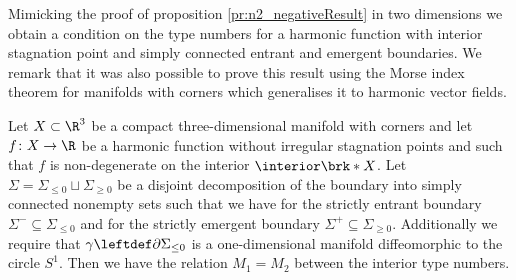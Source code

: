 Mimicking the proof of proposition \ref{pr:n2_negativeResult} in two dimensions we obtain a condition on the type numbers for a harmonic function with interior
stagnation point and simply connected entrant and emergent boundaries.
We remark that it was also possible to prove this result using the Morse index theorem for manifolds with corners which generalises it to harmonic vector fields.
\begin{proposition}\label{pr:n3_inflowOutflowRels}
  Let $X\subset\R^3$ be a compact three-dimensional manifold with corners and
  let $f\colon X\to\R$ be a harmonic function without irregular stagnation points and such that $f$ is non-degenerate on the interior $\interior\brk*{X}$.
  Let $\Sigma=\Sigma_{\leq0}\sqcup\Sigma_{\geq0}$ be a disjoint decomposition of the boundary into simply connected nonempty sets such that
  we have for the strictly entrant boundary $\Sigma^-\subseteq\Sigma_{\leq0}$ and for the strictly emergent boundary
  $\Sigma^+\subseteq\Sigma_{\geq0}$. Additionally we require that $\gamma\leftdef\partial\Sigma_{\leq0}$ is a one-dimensional manifold diffeomorphic to the
  circle $S^1$.
  Then we have the relation $M_1=M_2$ between the interior type numbers.
\end{proposition}
